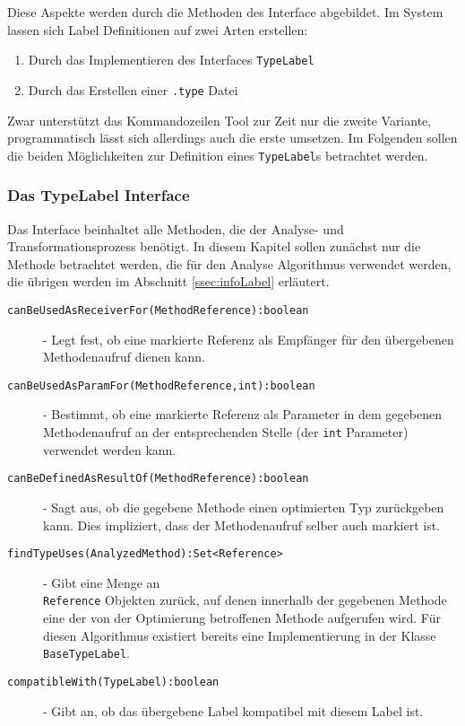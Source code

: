 Diese Aspekte werden durch die Methoden des Interface abgebildet. 
Im System lassen sich Label Definitionen auf zwei Arten erstellen:

\begin{enumerate} 
	\item Durch das Implementieren des Interfaces \texttt{TypeLabel}
	\item Durch das Erstellen einer \texttt{.type} Datei
\end{enumerate}

Zwar unterstützt das Kommandozeilen Tool zur Zeit nur die zweite Variante,
programmatisch lässt sich allerdings auch die erste umsetzen. Im 
Folgenden sollen die beiden Möglichkeiten zur Definition eines \texttt{TypeLabel}s
betrachtet werden.

\subsubsection{Das TypeLabel Interface} \label{sssec:typeLabel}

Das Interface beinhaltet alle Methoden, die der Analyse- und Transformationsprozess
benötigt. In diesem Kapitel sollen zunächst nur die Methode betrachtet werden, die
für den Analyse Algorithmus verwendet werden, die übrigen werden im Abschnitt 
\ref{ssec:infoLabel} erläutert. 

\begin{description}
	\item[\texttt{canBeUsedAsReceiverFor(MethodReference):boolean}] - Legt fest, ob eine 
	markierte Referenz als Empfänger für den übergebenen Methodenaufruf dienen kann.
	\item[\texttt{canBeUsedAsParamFor(MethodReference,int):boolean}] - Bestimmt, ob eine 
	markierte Referenz als Parameter in dem gegebenen Methodenaufruf an der 
	entsprechenden Stelle (der \texttt{int} Parameter) verwendet werden kann.
	\item[\texttt{canBeDefinedAsResultOf(MethodReference):boolean}] - Sagt aus, ob die 
	gegebene Methode einen optimierten Typ zurückgeben kann. Dies impliziert, dass
	der Methodenaufruf selber auch markiert ist.
	\item[\texttt{findTypeUses(AnalyzedMethod):Set<Reference>}] - Gibt eine Menge an \\\texttt{Reference}
	Objekten zurück, auf denen innerhalb der gegebenen Methode eine der von 
	der Optimierung betroffenen Methode aufgerufen wird. Für diesen Algorithmus 
	existiert bereits eine Implementierung in der Klasse \texttt{BaseTypeLabel}.
	\item[\texttt{compatibleWith(TypeLabel):boolean}] - Gibt an, ob das übergebene Label 
	kompatibel mit diesem Label ist.
\end{description}

